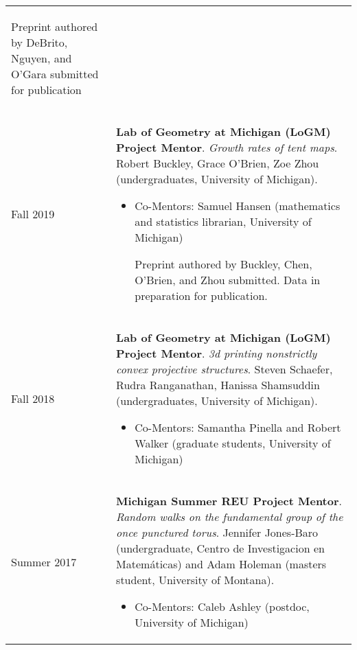 \begin{center}
{\begin{longtable}{p{}  p{}}
{\begin{itemize}
            Preprint authored by DeBrito, Nguyen, and O'Gara submitted for publication
            
        \end{itemize}
        }
        \vspace{-1em}
         \\ 
  Fall 2019 & \textbf{Lab of Geometry at Michigan (LoGM) Project Mentor}. \textit{Growth rates of tent maps}.  Robert Buckley, Grace O'Brien, Zoe Zhou (undergraduates, University of Michigan). 
        \hspace{-1em}

        {\small
        \begin{itemize}
        \setlength{\parindent}{0em}
        \item[] 
            Co-Mentors: Samuel Hansen (mathematics and statistics librarian, University of Michigan)

            Preprint authored by Buckley, Chen, O'Brien, and Zhou submitted. Data in preparation for publication.
            
        \end{itemize}
        }
        \vspace{-1em}
         \\ 
  Fall 2018 & \textbf{Lab of Geometry at Michigan (LoGM) Project Mentor}. \textit{3d printing nonstrictly convex projective structures}.  Steven Schaefer, Rudra Ranganathan, Hanissa Shamsuddin (undergraduates, University of Michigan). 
        \hspace{-1em}

        {\small
        \begin{itemize}
        \setlength{\parindent}{0em}
        \item[] 
            Co-Mentors: Samantha Pinella and Robert Walker (graduate students, University of Michigan) 
        \end{itemize}
        }
        \vspace{-1em}
         \\ 
  Summer 2017 & \textbf{Michigan Summer REU  Project Mentor}. \textit{Random walks on the fundamental group of the once punctured torus}.  Jennifer Jones-Baro (undergraduate, Centro de Investigacion en Matem\'aticas) and Adam Holeman (masters student, University of Montana). 
        \hspace{-1em}

        {\small
        \begin{itemize}
        \setlength{\parindent}{0em}
        \item[] 
            Co-Mentors: Caleb Ashley (postdoc, University of Michigan) 
        \end{itemize}
        }
        \vspace{-1em}
         
    \end{longtable}
    } 
    \end{center}

    \vspace{-1em}
    